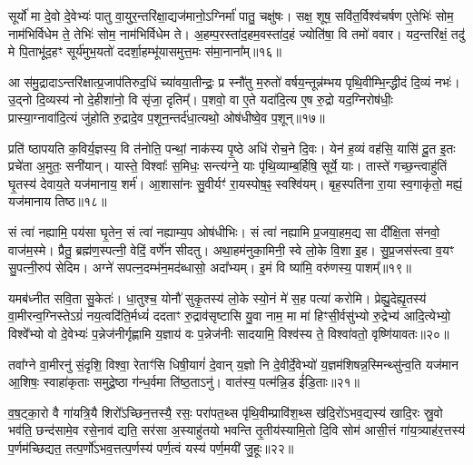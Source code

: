 सूर्यो॑ मा दे॒वो दे॒वेभ्यः॑ पातु वा॒युर॒न्तरि॑क्षा॒द्यज॑मानो॒\-ऽग्निर्मा॑ पातु॒ चक्षु॑षः। सक्ष॒ शूष॒ सवि॑त॒र्विश्व॑चर्\mbox{}षण ए॒तेभिः॑ सोम॒ नाम॑भिर्विधेम ते॒ तेभिः॑ सोम॒ नाम॑भिर्विधेम ते। अ॒हम्प॒रस्ता॑द॒हम॒वस्ता॑द॒हं ज्योति॑षा॒ वि तमो॑ ववार। यद॒न्तरि॑क्षं॒ तदु॑ मे पि॒ताभू॑द॒हꣳ सूर्य॑मुभ॒यतो॑ ददर्\mbox{}शा॒हम्भू॑यासमुत्त॒मः स॑मा॒नाना᳚म्॥१६॥

आ स॑मु॒द्रादा\-ऽन्तरि॑क्षात्प्र॒जाप॑तिरुद॒धिं च्या॑वया॒तीन्द्रः॒ प्र स्नौ॑तु म॒रुतो॑ वर्\mbox{}षय॒न्तून्न॑म्भय पृथि॒वीम्भि॒न्द्धीदं दि॒व्यं नभः॑। उ॒द्नो दि॒व्यस्य॑ नो दे॒हीशा॑नो॒ वि सृ॑जा॒ दृतिम्᳚। प॒शवो॒ वा ए॒ते यदा॑दि॒त्य ए॒ष रु॒द्रो यद॒ग्निरोष॑धीः॒ प्रास्या॒ग्नावा॑दि॒त्यं जु॑होति रु॒द्रादे॒व प॒शून॒न्तर्द॑धा॒त्यथो॒ ओष॑धीष्वे॒व प॒शून्॥१७॥

प्रति॑ ष्ठापयति क॒विर्य॒ज्ञस्य॒ वि त॑नोति॒ पन्थां॒ नाक॑स्य पृ॒ष्ठे अधि॑ रोच॒ने दि॒वः। येन॑ ह॒व्यं वह॑सि॒ यासि॑ दू॒त इ॒तः प्रचे॑ता अ॒मुतः॒ सनी॑यान्। यास्ते॒ विश्वाः᳚ स॒मिधः॒ सन्त्य॑ग्ने॒ याः पृ॑थि॒व्याम्ब॒र्\mbox{}हिषि॒ सूर्ये॒ याः। तास्ते॑ गच्छ॒न्त्वाहु॑तिं घृ॒तस्य॑ देवाय॒ते यज॑मानाय॒ शर्म॑। आ॒शासा॑नः सु॒वीर्यꣳ॑ रा॒यस्पोष॒ꣴ॒ स्वश्वि॑यम्। बृह॒स्पति॑ना रा॒या स्व॒गाकृ॑तो॒ मह्यं॒ यज॑मानाय तिष्ठ॥१८॥

{\anuvakamend[{स॒मा॒नाना॒मोष॑धीष्वे॒व प॒शून्मह्यं॒ यज॑माना॒यैक॑ञ्च॥५॥}]}

सं त्वा॑ नह्यामि॒ पय॑सा घृ॒तेन॒ सं त्वा॑ नह्याम्य॒प ओष॑धीभिः। सं त्वा॑ नह्यामि प्र॒जया॒हम॒द्य सा दी᳚क्षि॒ता स॑नवो॒ वाज॑म॒स्मे। प्रैतु॒ ब्रह्म॑ण॒स्पत्नी॒ वेदिं॒ वर्णे॑न सीदतु। अथा॒हम॑नुका॒मिनी॒ स्वे लो॒के वि॒शा इ॒ह। सु॒प्र॒जस॑स्त्वा व॒यꣳ सु॒पत्नी॒रुप॑ सेदिम। अग्ने॑ सपत्न॒दम्भ॑न॒मद॑ब्धासो॒ अदा᳚भ्यम्। इ॒मं वि ष्या॑मि॒ वरु॑णस्य॒ पाशम्᳚॥१९॥

यमब॑ध्नीत सवि॒ता सु॒केतः॑। धा॒तुश्च॒ योनौ॑ सुकृ॒तस्य॑ लो॒के स्यो॒नं मे॑ स॒ह पत्या॑ करोमि। प्रेह्यु॒देह्यृ॒तस्य॑ वा॒मीरन्व॒ग्निस्ते\-ऽग्रं॑ नय॒त्वदि॑ति॒र्मध्यं॑ ददताꣳ रु॒द्राव॑सृष्टासि यु॒वा नाम॒ मा मा॑ हिꣳसी॒र्वसु॑भ्यो रु॒द्रेभ्य॑ आदि॒त्येभ्यो॒ विश्वे᳚भ्यो वो दे॒वेभ्यः॑ प॒न्नेज॑नीर्गृह्णामि य॒ज्ञाय॑ वः प॒न्नेज॑नीः सादयामि॒ विश्व॑स्य ते॒ विश्वा॑वतो॒ वृष्णि॑यावतः॥२०॥

तवा᳚ग्ने वा॒मीरनु॑ सं॒दृशि॒ विश्वा॒ रेताꣳ॑सि धिषी॒यागं॑ दे॒वान् य॒ज्ञो नि दे॒वीर्दे॒वेभ्यो॑ य॒ज्ञम॑शिषन्न॒स्मिन्थ्सु॑न्व॒ति यज॑मान आ॒शिषः॒ स्वाहा॑कृताः समुद्रे॒ष्ठा ग॑न्ध॒र्वमा ति॑ष्ठ॒ता\-ऽनु॑। वात॑स्य॒ पत्म॑न्नि॒ड ई॑डि॒ताः॥२१॥

{\anuvakamend[{पाशं॒ वृष्णि॑यावतस्त्रि॒ꣳ॒शच्च॑॥६॥}]}

व॒ष॒ट्का॒रो वै गा॑यत्रि॒यै शिरो᳚\-ऽच्छिन॒त्तस्यै॒ रसः॒ परा॑पत॒थ्स पृ॑थि॒वीम्प्रावि॑श॒थ्स ख॑दि॒रो॑\-ऽभव॒द्यस्य॑ खादि॒रः स्रु॒वो भव॑ति॒ छन्द॑सामे॒व रसे॒नाव॑ द्यति॒ सर॑सा अ॒स्याहु॑तयो भवन्ति तृ॒तीय॑स्यामि॒तो दि॒वि सोम॑ आसी॒त्तं गा॑य॒त्र्याह॑र॒त्तस्य॑ प॒र्णम॑च्छिद्यत॒ तत्प॒र्णो॑\-ऽभव॒त्तत्प॒र्णस्य॑ पर्ण॒त्वं यस्य॑ पर्ण॒मयी॑ जु॒हूः॥२२॥

